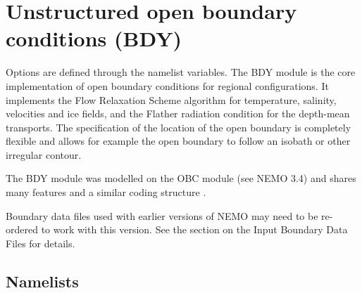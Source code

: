 \documentclass[../tex_main/NEMO_manual]{subfiles}
\begin{document}
\section{Unstructured open boundary conditions (BDY)}
\label{sec:LBC_bdy}


%

%

Options are defined through the   
  namelist variables.
The BDY module is the core implementation of open boundary
conditions for regional configurations. It implements the Flow
Relaxation Scheme algorithm for temperature, salinity, velocities and
ice fields, and the Flather radiation condition for the depth-mean
transports. The specification of the location of the open boundary is
completely flexible and allows for example the open boundary to follow
an isobath or other irregular contour. 

The BDY module was modelled on the OBC module (see NEMO 3.4) and shares many
features and a similar coding structure \citep{Chanut2005}.

Boundary data files used with earlier versions of NEMO may need
to be re-ordered to work with this version. See the
section on the Input Boundary Data Files for details.

\subsection{Namelists}
\label{subsec:BDY_namelist}
\end{document}
